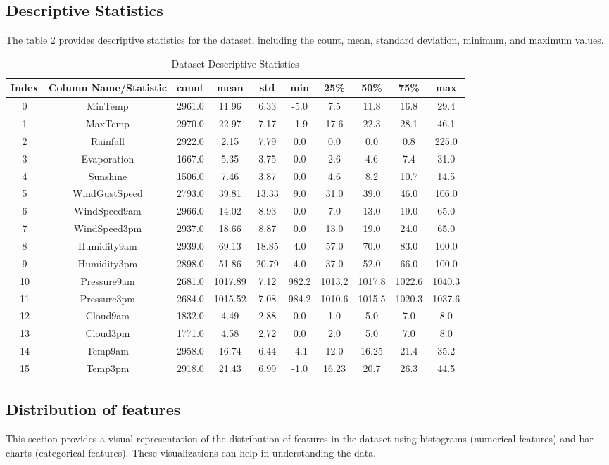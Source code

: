 \documentclass{article}%
\begin{document}
%
\newpage%
\subsection{Descriptive Statistics}%
\label{subsec:DescriptiveStatistics}%
The table 2 provides descriptive statistics for the dataset, including the count, mean, standard deviation, minimum, and maximum values.%


\begin{table}[h!]%
\caption{Dataset Descriptive Statistics}%
\vspace{0.2cm}%
\centering%
\begin{tabular}{|c||c||c||c||c||c||c||c||c||c|}%
\hline%
Index&Column Name/Statistic&count&mean&std&min&25\%&50\%&75\%&max\\%
\hline%
0&MinTemp&2961.0&11.96&6.33&{-}5.0&7.5&11.8&16.8&29.4\\%
1&MaxTemp&2970.0&22.97&7.17&{-}1.9&17.6&22.3&28.1&46.1\\%
2&Rainfall&2922.0&2.15&7.79&0.0&0.0&0.0&0.8&225.0\\%
3&Evaporation&1667.0&5.35&3.75&0.0&2.6&4.6&7.4&31.0\\%
4&Sunshine&1506.0&7.46&3.87&0.0&4.6&8.2&10.7&14.5\\%
5&WindGustSpeed&2793.0&39.81&13.33&9.0&31.0&39.0&46.0&106.0\\%
6&WindSpeed9am&2966.0&14.02&8.93&0.0&7.0&13.0&19.0&65.0\\%
7&WindSpeed3pm&2937.0&18.66&8.87&0.0&13.0&19.0&24.0&65.0\\%
8&Humidity9am&2939.0&69.13&18.85&4.0&57.0&70.0&83.0&100.0\\%
9&Humidity3pm&2898.0&51.86&20.79&4.0&37.0&52.0&66.0&100.0\\%
10&Pressure9am&2681.0&1017.89&7.12&982.2&1013.2&1017.8&1022.6&1040.3\\%
11&Pressure3pm&2684.0&1015.52&7.08&984.2&1010.6&1015.5&1020.3&1037.6\\%
12&Cloud9am&1832.0&4.49&2.88&0.0&1.0&5.0&7.0&8.0\\%
13&Cloud3pm&1771.0&4.58&2.72&0.0&2.0&5.0&7.0&8.0\\%
14&Temp9am&2958.0&16.74&6.44&{-}4.1&12.0&16.25&21.4&35.2\\%
15&Temp3pm&2918.0&21.43&6.99&{-}1.0&16.23&20.7&26.3&44.5\\%
\hline%
\end{tabular}%
\end{table}

%
\newpage%
\subsection{Distribution of features}%
\label{subsec:Distributionoffeatures}%
This section provides a visual representation of the distribution of features in the dataset using histograms (numerical features) and bar charts (categorical features). These visualizations can help in understanding the data.%
\end{document}
